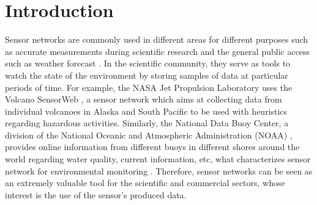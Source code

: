 


\chapter{Introduction}

Sensor networks are commonly used in different areas for different purposes
such as accurate measurements during scientific research \cite{sn-intro01} and
the general public access such as weather forecast \cite{sn-intro02}. In the
scientific community, they serve as tools to watch the state of the environment
by storing samples of data at particular periods of time. For example, the
NASA Jet Propulsion Laboratory uses the Volcano SensorWeb \cite{sn-ex02}, a
sensor network which aims at collecting data from individual volcanoes in
Alaska and South Pacific to be used with heuristics regarding hazardous
activities. Similarly, the National Data Buoy Center, a division of the
National Oceanic and Atmospheric Administration (NOAA) \cite{sn-ex03},
provides online information from different buoys in different shores around
the world regarding water quality, current information, etc, what
characterizes sensor network for environmental monitoring \cite{sn-ex01}.
Therefore, sensor networks can be seen as an extremely valuable tool
for the scientific and commercial sectors, whose interest is the use of
the sensor's produced data.

